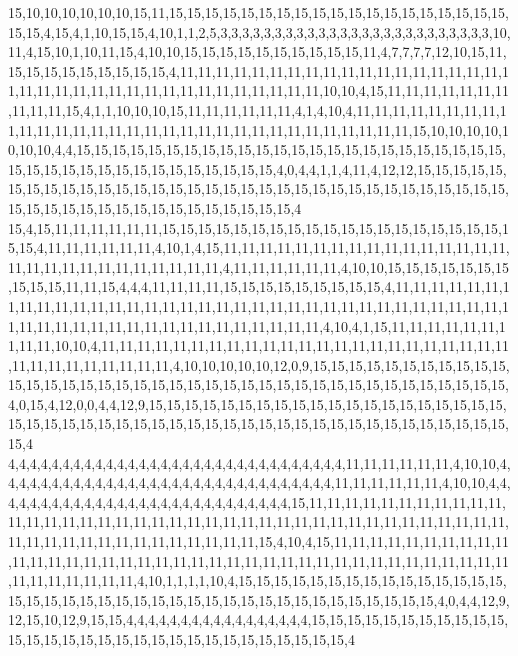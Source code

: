 15,10,10,10,10,10,10,15,11,15,15,15,15,15,15,15,15,15,15,15,15,15,15,15,15,15,15,15,15,15,4,15,4,1,10,15,15,4,10,1,1,2,5,3,3,3,3,3,3,3,3,3,3,3,3,3,3,3,3,3,3,3,3,3,3,3,3,3,10,11,4,15,10,1,10,11,15,4,10,10,15,15,15,15,15,15,15,15,15,15,11,4,7,7,7,7,12,10,15,11,15,15,15,15,15,15,15,15,15,4,11,11,11,11,11,11,11,11,11,11,11,11,11,11,11,11,11,11,11,11,11,11,11,11,11,11,11,11,11,11,11,11,11,11,11,11,10,10,4,15,11,11,11,11,11,11,11,11,11,11,15,4,1,1,10,10,10,15,11,11,11,11,11,11,4,1,4,10,4,11,11,11,11,11,11,11,11,11,11,11,11,11,11,11,11,11,11,11,11,11,11,11,11,11,11,11,11,11,11,11,15,10,10,10,10,10,10,10,4,4,15,15,15,15,15,15,15,15,15,15,15,15,15,15,15,15,15,15,15,15,15,15,15,15,15,15,15,15,15,15,15,15,15,15,15,15,15,15,15,4,0,4,4,1,1,4,11,4,12,12,15,15,15,15,15,15,15,15,15,15,15,15,15,15,15,15,15,15,15,15,15,15,15,15,15,15,15,15,15,15,15,15,15,15,15,15,15,15,15,15,15,15,15,15,15,15,15,15,15,4
15,4,15,11,11,11,11,11,11,15,15,15,15,15,15,15,15,15,15,15,15,15,15,15,15,15,15,15,15,15,4,11,11,11,11,11,11,4,10,1,4,15,11,11,11,11,11,11,11,11,11,11,11,11,11,11,11,11,11,11,11,11,11,11,11,11,11,11,11,11,4,11,11,11,11,11,11,4,10,10,15,15,15,15,15,15,15,15,15,15,11,11,15,4,4,4,11,11,11,11,15,15,15,15,15,15,15,15,15,4,11,11,11,11,11,11,11,11,11,11,11,11,11,11,11,11,11,11,11,11,11,11,11,11,11,11,11,11,11,11,11,11,11,11,11,11,11,11,11,11,11,11,11,11,11,11,11,11,11,11,11,11,4,10,4,1,15,11,11,11,11,11,11,11,11,11,10,10,4,11,11,11,11,11,11,11,11,11,11,11,11,11,11,11,11,11,11,11,11,11,11,11,11,11,11,11,11,11,11,11,11,4,10,10,10,10,10,12,0,9,15,15,15,15,15,15,15,15,15,15,15,15,15,15,15,15,15,15,15,15,15,15,15,15,15,15,15,15,15,15,15,15,15,15,15,15,15,15,15,4,0,15,4,12,0,0,4,4,12,9,15,15,15,15,15,15,15,15,15,15,15,15,15,15,15,15,15,15,15,15,15,15,15,15,15,15,15,15,15,15,15,15,15,15,15,15,15,15,15,15,15,15,15,15,15,15,15,15,15,4
4,4,4,4,4,4,4,4,4,4,4,4,4,4,4,4,4,4,4,4,4,4,4,4,4,4,4,4,4,4,4,11,11,11,11,11,11,4,10,10,4,4,4,4,4,4,4,4,4,4,4,4,4,4,4,4,4,4,4,4,4,4,4,4,4,4,4,4,4,4,4,11,11,11,11,11,11,4,10,10,4,4,4,4,4,4,4,4,4,4,4,4,4,4,4,4,4,4,4,4,4,4,4,4,4,4,4,4,15,11,11,11,11,11,11,11,11,11,11,11,11,11,11,11,11,11,11,11,11,11,11,11,11,11,11,11,11,11,11,11,11,11,11,11,11,11,11,11,11,11,11,11,11,11,11,11,11,11,11,11,11,11,15,4,10,4,15,11,11,11,11,11,11,11,11,11,11,11,11,11,11,11,11,11,11,11,11,11,11,11,11,11,11,11,11,11,11,11,11,11,11,11,11,11,11,11,11,11,11,11,11,11,4,10,1,1,1,1,10,4,15,15,15,15,15,15,15,15,15,15,15,15,15,15,15,15,15,15,15,15,15,15,15,15,15,15,15,15,15,15,15,15,15,15,15,15,15,15,15,4,0,4,4,12,9,12,15,10,12,9,15,15,4,4,4,4,4,4,4,4,4,4,4,4,4,4,4,4,4,15,15,15,15,15,15,15,15,15,15,15,15,15,15,15,15,15,15,15,15,15,15,15,15,15,15,15,15,15,15,4
